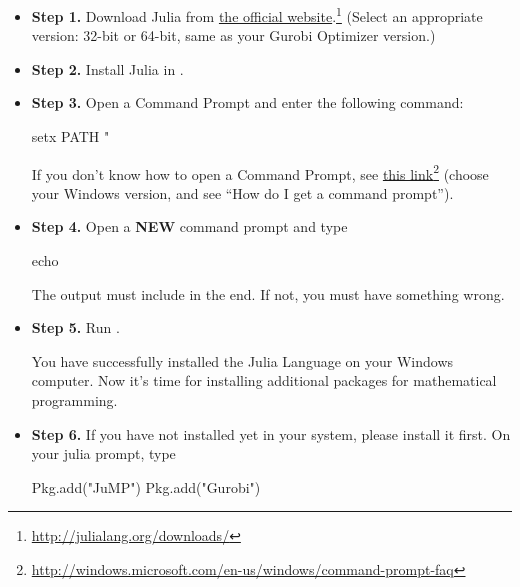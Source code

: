 \begin{itemize}
\item \textbf{Step 1.} Download Julia from \href{http://julialang.org/downloads/}{the official website}.\footnote{\url{http://julialang.org/downloads/}} (Select an appropriate version: 32-bit or 64-bit, same as your Gurobi Optimizer version.)


\item \textbf{Step 2.}  Install Julia in .


\item \textbf{Step 3.} Open a Command Prompt and enter the following command:
\begin{code}
setx PATH "%
\end{code}


If you don’t know how to open a Command Prompt, see \href{http://windows.microsoft.com/en-us/windows/command-prompt-faq}{this link}\footnote{\url{http://windows.microsoft.com/en-us/windows/command-prompt-faq}} (choose your Windows version, and see ``How do I get a command prompt'').

\item \textbf{Step 4.} Open a \textbf{NEW} command prompt and type
\begin{code}
echo %
\end{code}


The output must include  in the end. If not, you must have something wrong.

\item \textbf{Step 5.} Run .


You have successfully installed the Julia Language on your Windows computer. Now it’s time for installing additional packages for mathematical programming.

\item \textbf{Step 6.} If you have not installed \gurobi{} yet in your system, please install it first. On your julia prompt, type
\begin{code}
Pkg.add("JuMP")
Pkg.add("Gurobi")
\end{code}


\end{itemize}
